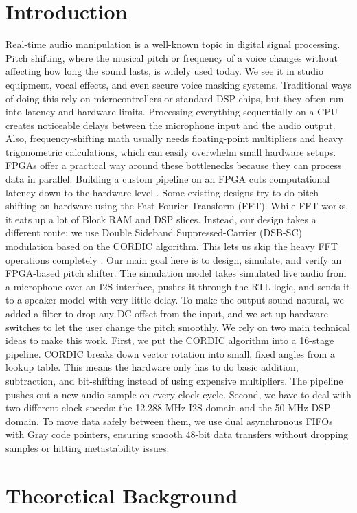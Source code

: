 \documentclass[runningheads]{llncs}
\begin{document}
\section{Introduction}
Real-time audio manipulation is a well-known topic in digital signal processing. Pitch shifting, where the musical pitch or frequency of a voice changes without affecting how long the sound lasts, is widely used today. We see it in studio equipment, vocal effects, and even secure voice masking systems. Traditional ways of doing this rely on microcontrollers or standard DSP chips, but they often run into latency and hardware limits. Processing everything sequentially on a CPU creates noticeable delays between the microphone input and the audio output. Also, frequency-shifting math usually needs floating-point multipliers and heavy trigonometric calculations, which can easily overwhelm small hardware setups.
FPGAs offer a practical way around these bottlenecks because they can process data in parallel. Building a custom pipeline on an FPGA cuts computational latency down to the hardware level \cite{ref_meher}. Some existing designs try to do pitch shifting on hardware using the Fast Fourier Transform (FFT). While FFT works, it eats up a lot of Block RAM and DSP slices. Instead, our design takes a different route: we use Double Sideband Suppressed-Carrier (DSB-SC) modulation based on the CORDIC algorithm. This lets us skip the heavy FFT operations completely \cite{ref_smith}.
Our main goal here is to design, simulate, and verify an FPGA-based pitch shifter. The simulation model takes simulated live audio from a microphone over an I2S interface, pushes it through the RTL logic, and sends it to a speaker model with very little delay. To make the output sound natural, we added a filter to drop any DC offset from the input, and we set up hardware switches to let the user change the pitch smoothly.
We rely on two main technical ideas to make this work. First, we put the CORDIC algorithm into a 16-stage pipeline. CORDIC breaks down vector rotation into small, fixed angles from a lookup table. This means the hardware only has to do basic addition, subtraction, and bit-shifting instead of using expensive multipliers. The pipeline pushes out a new audio sample on every clock cycle. Second, we have to deal with two different clock speeds: the 12.288 MHz I2S domain and the 50 MHz DSP domain. To move data safely between them, we use dual asynchronous FIFOs with Gray code pointers, ensuring smooth 48-bit data transfers without dropping samples or hitting metastability issues.
\section{Theoretical Background}
\end{document}
